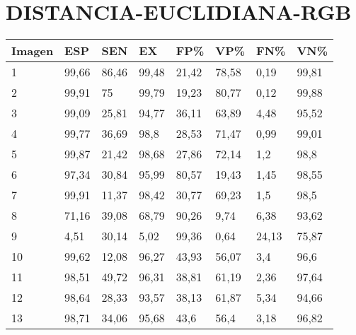 \section{DISTANCIA-EUCLIDIANA-RGB}
\begin{longtable}[c]{|l|l|l|l|l|l|l|l|}
\hline
\textbf{Imagen} & \textbf{ESP} & \textbf{SEN} & \textbf{EX} & \textbf{FP\%} & \textbf{VP\%} & \textbf{FN\%} & \textbf{VN\%} \\ \hline
\endfirsthead
%
\endhead
%
1               & 99,66        & 86,46        & 99,48       & 21,42         & 78,58         & 0,19          & 99,81         \\ \hline
2               & 99,91        & 75           & 99,79       & 19,23         & 80,77         & 0,12          & 99,88         \\ \hline
3               & 99,09        & 25,81        & 94,77       & 36,11         & 63,89         & 4,48          & 95,52         \\ \hline
4               & 99,77        & 36,69        & 98,8        & 28,53         & 71,47         & 0,99          & 99,01         \\ \hline
5               & 99,87        & 21,42        & 98,68       & 27,86         & 72,14         & 1,2           & 98,8          \\ \hline
6               & 97,34        & 30,84        & 95,99       & 80,57         & 19,43         & 1,45          & 98,55         \\ \hline
7               & 99,91        & 11,37        & 98,42       & 30,77         & 69,23         & 1,5           & 98,5          \\ \hline
8               & 71,16        & 39,08        & 68,79       & 90,26         & 9,74          & 6,38          & 93,62         \\ \hline
9               & 4,51         & 30,14        & 5,02        & 99,36         & 0,64          & 24,13         & 75,87         \\ \hline
10              & 99,62        & 12,08        & 96,27       & 43,93         & 56,07         & 3,4           & 96,6          \\ \hline
11              & 98,51        & 49,72        & 96,31       & 38,81         & 61,19         & 2,36          & 97,64         \\ \hline
12              & 98,64        & 28,33        & 93,57       & 38,13         & 61,87         & 5,34          & 94,66         \\ \hline
13              & 98,71        & 34,06        & 95,68       & 43,6          & 56,4          & 3,18          & 96,82         \\ \hline

\end{longtable}
